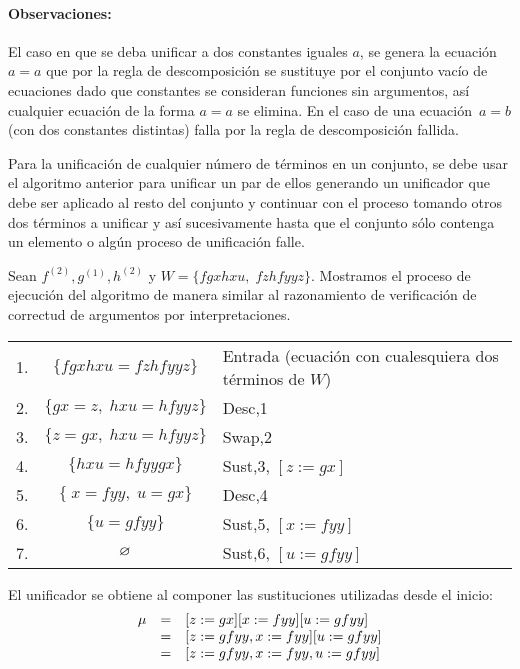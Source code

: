\documentclass[11pt,letterpaper]{article}
\begin{document}
\paragraph{Observaciones:} El caso en que se deba unificar a dos constantes 
iguales $a$, se genera la ecuación $a=a$ que por la regla de descomposición se 
sustituye por el conjunto vacío de ecuaciones dado que constantes se 
consideran funciones sin argumentos, as\'i cualquier ecuación de la forma 
$a=a$ se elimina. 
En el caso de una ecuación~$a=b$ (con dos constantes distintas) falla por la 
regla de descomposición fallida.

\bigskip

Para la unificaci\'on de cualquier n\'umero de t\'erminos en un conjunto, se 
debe usar el algoritmo anterior para unificar un par de ellos generando un 
unificador que debe ser aplicado al resto del conjunto y continuar con el 
proceso tomando otros dos t\'erminos a unificar y as\'i sucesivamente hasta que 
el conjunto s\'olo contenga un elemento o alg\'un proceso de unificaci\'on 
falle. 


\begin{eje}
  Sean $f^{(2)},g^{(1)},h^{(2)}$ y $W=\{fgxhxu,\;fzhfyyz\}$. Mostramos el 
proceso de ejecución del algoritmo de manera similar al razonamiento de 
verificación de correctud de argumentos por interpretaciones.\\
\begin{tabular}{rcl}
 1.& $\{fgxhxu=fzhfyyz\}$ &  Entrada (ecuaci\'on con cualesquiera dos 
t\'erminos de $W$)\\
 2.& $\{gx=z,\;hxu=hfyyz\}$ & {\sc Desc},1 \\
 3.& $\{z=gx,\;hxu=hfyyz\}$ & {\sc Swap},2 \\
 4.& $\{hxu=hfyygx\}$ & {\sc Sust},3, $[z:=gx]$ \\
 5.& $\{\;x=fyy,\;u=gx\}$ & {\sc Desc},4  \\
 6.& $\{u=gfyy\}$& {\sc Sust},5, $[x:=fyy]$  \\
 7.& $\vacio$ &{\sc Sust},6, $[u:=gfyy]$ 
\end{tabular}

El unificador se obtiene al componer las sustituciones utilizadas desde el 
inicio:
\[
\ba{rll}
\mu & = & [z:=gx][x:=fyy][u:=gfyy]\\
    & = & [z:=gfyy,x:=fyy][u:=gfyy]\\
    & = & [z:=gfyy,x:=fyy,u:=gfyy]
\ea
\]
\end{eje}
\end{document}
